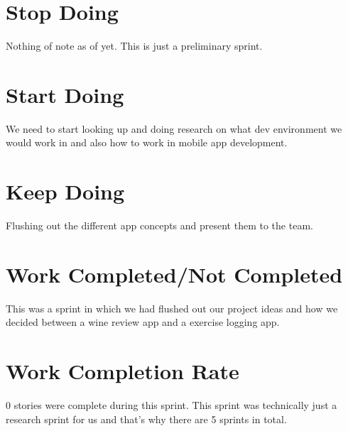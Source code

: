 \documentclass[12pt,letterpaper]{article}
\begin{document}
	\section*{Stop Doing}
		Nothing of note as of yet. This is just a preliminary sprint.
	\section*{Start Doing}
		We need to start looking up and doing research on what dev environment we would work in and also how to work in mobile app development.
	\section*{Keep Doing}
		Flushing out the different app concepts and present them to the team.
	\section*{Work Completed/Not Completed}
		This was a sprint in which we had flushed out our project ideas and how we decided between a wine review app and a exercise logging app.
	\section*{Work Completion Rate}
		0 stories were complete during this sprint. This sprint was technically just a research sprint for us and that's why there are 5 sprints in total.
\end{document}
